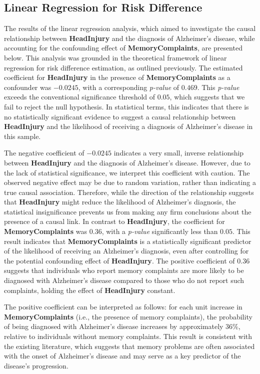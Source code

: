 \documentclass[12pt]{article}
\begin{document}
\subsection{Linear Regression for Risk Difference}

The results of the linear regression analysis, which aimed to investigate the causal relationship between \textbf{HeadInjury} and the diagnosis of Alzheimer's disease, while accounting for the confounding effect of \textbf{MemoryComplaints}, are presented below. This analysis was grounded in the theoretical framework of linear regression for risk difference estimation, as outlined previously.
The estimated coefficient for \textbf{HeadInjury} in the presence of \textbf{MemoryComplaints} as a confounder was \(-0.0245\), with a corresponding \textit{p-value} of \(0.469\). This \textit{p-value} exceeds the conventional significance threshold of \(0.05\), which suggests that we fail to reject the null hypothesis. In statistical terms, this indicates that there is no statistically significant evidence to suggest a causal relationship between \textbf{HeadInjury} and the likelihood of receiving a diagnosis of Alzheimer's disease in this sample.

The negative coefficient of \(-0.0245\) indicates a very small, inverse relationship between \textbf{HeadInjury} and the diagnosis of Alzheimer's disease. However, due to the lack of statistical significance, we interpret this coefficient with caution. The observed negative effect may be due to random variation, rather than indicating a true causal association. Therefore, while the direction of the relationship suggests that \textbf{HeadInjury} might reduce the likelihood of Alzheimer's diagnosis, the statistical insignificance prevents us from making any firm conclusions about the presence of a causal link.
In contrast to \textbf{HeadInjury}, the coefficient for \textbf{MemoryComplaints} was \(0.36\), with a \textit{p-value} significantly less than \(0.05\). This result indicates that \textbf{MemoryComplaints} is a statistically significant predictor of the likelihood of receiving an Alzheimer's diagnosis, even after controlling for the potential confounding effect of \textbf{HeadInjury}. The positive coefficient of \(0.36\) suggests that individuals who report memory complaints are more likely to be diagnosed with Alzheimer's disease compared to those who do not report such complaints, holding the effect of \textbf{HeadInjury} constant.

The positive coefficient can be interpreted as follows: for each unit increase in \textbf{MemoryComplaints} (i.e., the presence of memory complaints), the probability of being diagnosed with Alzheimer's disease increases by approximately 36\%, relative to individuals without memory complaints. This result is consistent with the existing literature, which suggests that memory problems are often associated with the onset of Alzheimer's disease and may serve as a key predictor of the disease's progression.
\end{document}
